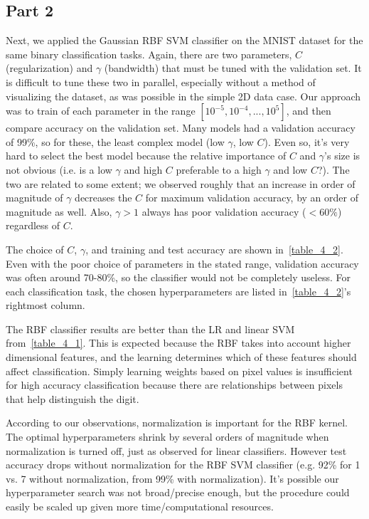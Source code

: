 \subsection{Part 2}
Next, we applied the Gaussian RBF SVM classifier on the MNIST dataset for the same binary classification tasks.
Again, there are two parameters, $C$ (regularization) and $\gamma$ (bandwidth) that must be tuned with the validation set.
It is difficult to tune these two in parallel, especially without a method of visualizing the dataset, as was possible in the simple 2D data case.
Our approach was to train of each parameter in the range $[10^{-5}, 10^{-4}, ..., 10^{5}]$, and then compare accuracy on the validation set.
Many models had a validation accuracy of 99\%, so for these, the least complex model (low $\gamma$, low $C$).
Even so, it's very hard to select the best model because the relative importance of $C$ and $\gamma$'s size is not obvious (i.e. is a low $\gamma$ and high $C$ preferable to a high $\gamma$ and low $C$?).
The two are related to some extent; we observed roughly that an increase in order of magnitude of $\gamma$ decreases the $C$ for maximum validation accuracy, by an order of magnitude as well.
Also, $\gamma>1$ always has poor validation accuracy ($<60\%$) regardless of $C$.

The choice of $C$, $\gamma$, and training and test accuracy are shown in~\cref{table_4_2}.
Even with the poor choice of parameters in the stated range, validation accuracy was often around 70-80\%, so the classifier would not be completely useless.
For each classification task, the chosen hyperparameters are listed in~\cref{table_4_2}'s rightmost column.

The RBF classifier results are better than the LR and linear SVM from~\cref{table_4_1}.
This is expected because the RBF takes into account higher dimensional features, and the learning determines which of these features should affect classification.
Simply learning weights based on pixel values is insufficient for high accuracy classification because there are relationships between pixels that help distinguish the digit.

According to our observations, normalization is important for the RBF kernel.
The optimal hyperparameters shrink by several orders of magnitude when normalization is turned off, just as observed for linear classifiers.
However test accuracy drops without normalization for the RBF SVM classifier (e.g. 92\% for 1 vs. 7 without normalization, from 99\% with normalization).
It's possible our hyperparameter search was not broad/precise enough, but the procedure could easily be scaled up given more time/computational resources.


